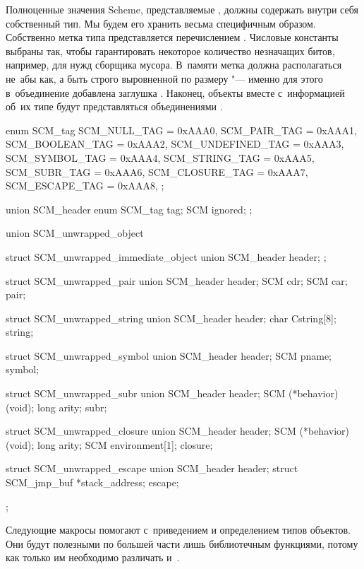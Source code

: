 Полноценные значения Scheme, представляемые , должны содержать
внутри себя собственный тип. Мы будем его хранить весьма специфичным образом.
Собственно метка типа представляется перечислением . Числовые
константы выбраны так, чтобы гарантировать некоторое количество незначащих
битов, например, для нужд сборщика мусора. В~памяти метка должна располагаться
не~абы как, а быть строго выровненной по размеру  "--- именно для этого
в~объединение  добавлена заглушка . Наконец, объекты
вместе с~информацией об~их типе будут представляться объединениями
.

\begin{code:c}
enum SCM_tag {
    SCM_NULL_TAG      = 0xAAA0,
    SCM_PAIR_TAG      = 0xAAA1,
    SCM_BOOLEAN_TAG   = 0xAAA2,
    SCM_UNDEFINED_TAG = 0xAAA3,
    SCM_SYMBOL_TAG    = 0xAAA4,
    SCM_STRING_TAG    = 0xAAA5,
    SCM_SUBR_TAG      = 0xAAA6,
    SCM_CLOSURE_TAG   = 0xAAA7,
    SCM_ESCAPE_TAG    = 0xAAA8,
};

union SCM_header {
    enum SCM_tag tag;
    SCM ignored;
};

union SCM_unwrapped_object {
    struct SCM_unwrapped_immediate_object {
        union SCM_header header;
    };

    struct SCM_unwrapped_pair {
        union SCM_header header;
        SCM cdr;
        SCM car;
    } pair;
    
    struct SCM_unwrapped_string {
        union SCM_header header;
        char Cstring[8];
    } string;
    
    struct SCM_unwrapped_symbol {
        union SCM_header header;
        SCM pname;
    } symbol;

    struct SCM_unwrapped_subr {
        union SCM_header header;
        SCM (*behavior)(void);
        long arity;
    } subr;

    struct SCM_unwrapped_closure {
        union SCM_header header;
        SCM (*behavior)(void);
        long arity;
        SCM environment[1];
    } closure;

    struct SCM_unwrapped_escape {
        union SCM_header header;
        struct SCM_jmp_buf *stack_address;
    } escape;
};
\end{code:c}

Следующие макросы помогают с~приведением и определением типов объектов. Они
будут полезными по большей части лишь библиотечным функциями, потому как только
им необходимо различать  и~.

